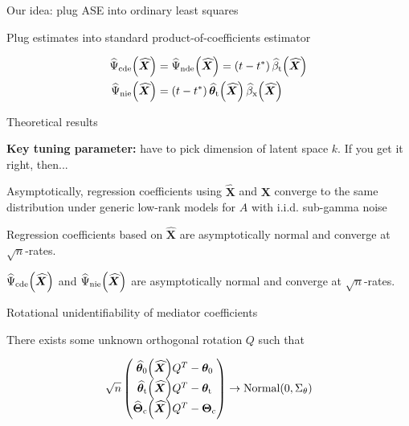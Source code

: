 \documentclass{beamer}
\theoremstyle{remark}
\newcommand{\X}{\bm X}
\newcommand{\Xhat}{\widehat{\X}}
\newcommand{\thetazero}{\bm \theta_0}
\newcommand{\thetat}{\bm \theta_\text{t}}
\newcommand{\Thetac}{\bm \Theta_\text{c}}
\newcommand \thetazerohat [1] {\widehat{\bm \theta}_0 \paren*{#1}}
\newcommand \thetathat [1] {\widehat{\bm \theta}_\text{t} \paren*{#1}}
\newcommand \Thetachat [1] {\widehat{\bm \Theta}_\text{c} \paren*{#1}}
\newcommand \betathat [1] {\widehat{\beta}_\text{t} \paren*{#1}}
\newcommand \betaxhat [1] {\widehat{\beta}_\text{x} \paren*{#1}}
\newcommand \cdehat [1] {\widehat{\Psi}_\text{cde} \paren*{#1}}
\newcommand \ndehat [1] {\widehat{\Psi}_\text{nde} \paren*{#1}}
\newcommand \niehat [1] {\widehat{\Psi}_\text{nie} \paren*{#1}}
\DeclarePairedDelimiter{\paren}{(}{)}
\begin{document}
\begin{frame}{Our idea: plug ASE into ordinary least squares}

    Plug estimates into standard product-of-coefficients estimator

    \begin{align*}
        \cdehat{\Xhat} & = \ndehat{\Xhat} = \paren*{t - t^*} \, \betathat{\Xhat}     \\
        \niehat{\Xhat} & = \paren*{t - t^*} \, \thetathat{\Xhat} \, \betaxhat{\Xhat}
    \end{align*}

\end{frame}

\begin{frame}{Theoretical results}

    \textbf{Key tuning parameter:} have to pick dimension of latent space $k$. If you get it right, then...

    \begin{theorem}[informal]
        Asymptotically, regression coefficients using $\Xhat$ and $\X$ converge to the same distribution under generic low-rank models for $A$ with i.i.d. sub-gamma noise
    \end{theorem}

    \begin{corollary}[informal]
        Regression coefficients based on $\Xhat$ are asymptotically normal and converge at $\sqrt n$-rates.
    \end{corollary}

    \begin{corollary}[informal]
        $\cdehat{\Xhat}$ and $\niehat{\Xhat}$ are asymptotically normal and converge at $\sqrt n$-rates.
    \end{corollary}
\end{frame}

\begin{frame}{Rotational unidentifiability of mediator coefficients}

    There exists some unknown orthogonal rotation $Q$ such that

    \begin{align*}
        \sqrt n
        \begin{pmatrix}
            \thetazerohat{\Xhat} Q^T - \thetazero \\
            \thetathat{\Xhat} Q^T - \thetat       \\
            \Thetachat{\Xhat} Q^T - \Thetac
        \end{pmatrix}
        \to
        \mathrm{Normal} \paren*{0, \Sigma_\theta}
    \end{align*}
\end{frame}
\end{document}
